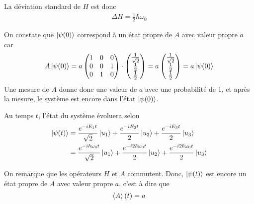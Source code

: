 \documentclass[12pt,solution=false]{uqtrassignment}
\begin{document}
\begin{problem}{}
\begin{solution}
La déviation standard de $H$ est donc
\begin{align}
  \Delta H = \frac{1}{2} \hbar \omega_0
\end{align}


\subproblem
On constate que $\ket{\psi(0)}$ correspond à un état propre de $A$
  avec valeur propre $a$ car
\begin{align}
  A \ket{\psi(0)}
  =
  a
  \begin{pmatrix}
     1 & 0 & 0 \\
     0 & 0 & 1 \\
     0 & 1 & 0 \\
  \end{pmatrix}
  \cdot
  \begin{pmatrix}
     \tfrac{1}{\sqrt{2}} \\
     \tfrac{1}{2} \\
     \tfrac{1}{2} \\
  \end{pmatrix}
  =
  a
  \begin{pmatrix}
     \tfrac{1}{\sqrt{2}} \\
     \tfrac{1}{2} \\
     \tfrac{1}{2} \\
  \end{pmatrix}
  = a \ket{\psi(0)}
\end{align}
Une mesure de $A$ donne donc une valeur de $a$
  avec une probabilité de 1,
  et après la mesure, le système est encore dans l'état $\ket{\psi(0)}$.

\subproblem
Au temps $t$, l'état du système évoluera selon
\begin{align}
  \ket{\psi(t)}
  &= \frac{e^{-iE_1 t}}{\sqrt{2}} \ket{u_1}
   + \frac{e^{-iE_2 t}}{2} \ket{u_2}
   + \frac{e^{-iE_3 t}}{2} \ket{u_3}
\\
  &= \frac{e^{-i\hbar \omega_0 t}}{\sqrt{2}} \ket{u_1}
   + \frac{e^{-i2\hbar \omega_0 t}}{2} \ket{u_2}
   + \frac{e^{-i2\hbar \omega_0 t}}{2} \ket{u_3}
\end{align}


\subproblem
On remarque que les opérateurs $H$ et $A$ commutent.
Donc, $\ket{\psi(t)}$ est encore un état propre de $A$ avec valeur propre $a$,
  c'est à dire que
\begin{align}
  \braket{A}(t) = a
\end{align}


\end{solution}
\end{problem}
\end{document}
